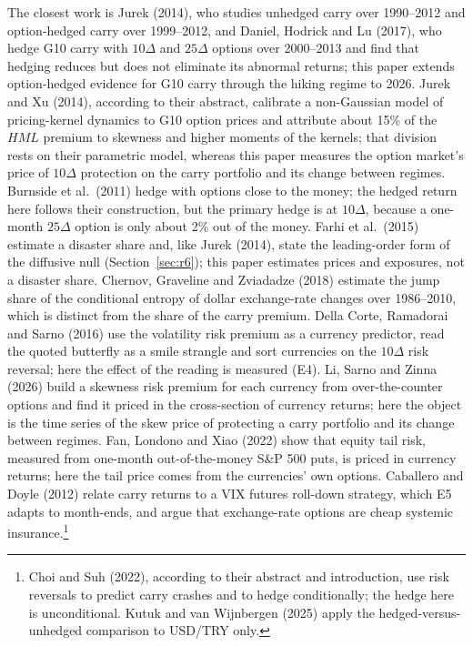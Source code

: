 \documentclass[11pt]{article}
\theoremstyle{result}
\newcommand{\HML}{\mathit{HML}}
\newcommand{\D}{\Delta}
\begin{document}
The closest work is Jurek (2014), who studies unhedged carry over 1990--2012 and option-hedged carry over 1999--2012, and Daniel, Hodrick and Lu (2017), who hedge G10 carry with $10\D$ and $25\D$ options over 2000--2013 and find that hedging reduces but does not eliminate its abnormal returns; this paper extends option-hedged evidence for G10 carry through the hiking regime to 2026. Jurek and Xu (2014), according to their abstract, calibrate a non-Gaussian model of pricing-kernel dynamics to G10 option prices and attribute about 15\% of the $\HML$ premium to skewness and higher moments of the kernels; that division rests on their parametric model, whereas this paper measures the option market's price of $10\D$ protection on the carry portfolio and its change between regimes. Burnside et al.\ (2011) hedge with options close to the money; the hedged return here follows their construction, but the primary hedge is at $10\D$, because a one-month $25\D$ option is only about 2\% out of the money. Farhi et al.\ (2015) estimate a disaster share and, like Jurek (2014), state the leading-order form of the diffusive null (Section~\ref{sec:r6}); this paper estimates prices and exposures, not a disaster share. Chernov, Graveline and Zviadadze (2018) estimate the jump share of the conditional entropy of dollar exchange-rate changes over 1986--2010, which is distinct from the share of the carry premium. Della Corte, Ramadorai and Sarno (2016) use the volatility risk premium as a currency predictor, read the quoted butterfly as a smile strangle and sort currencies on the $10\D$ risk reversal; here the effect of the reading is measured (E4). Li, Sarno and Zinna (2026) build a skewness risk premium for each currency from over-the-counter options and find it priced in the cross-section of currency returns; here the object is the time series of the skew price of protecting a carry portfolio and its change between regimes. Fan, Londono and Xiao (2022) show that equity tail risk, measured from one-month out-of-the-money S\&P 500 puts, is priced in currency returns; here the tail price comes from the currencies' own options. Caballero and Doyle (2012) relate carry returns to a VIX futures roll-down strategy, which E5 adapts to month-ends, and argue that exchange-rate options are cheap systemic insurance.\footnote{Choi and Suh (2022), according to their abstract and introduction, use risk reversals to predict carry crashes and to hedge conditionally; the hedge here is unconditional. Kutuk and van Wijnbergen (2025) apply the hedged-versus-unhedged comparison to USD/TRY only.}
\end{document}
